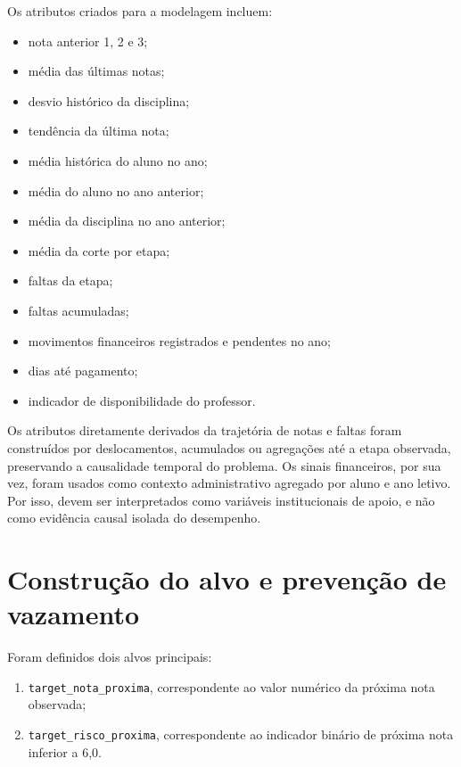 Os atributos criados para a modelagem incluem:
\begin{itemize}
    \item nota anterior 1, 2 e 3;
    \item m\'edia das \'ultimas notas;
    \item desvio hist\'orico da disciplina;
    \item tend\^encia da \'ultima nota;
    \item m\'edia hist\'orica do aluno no ano;
    \item m\'edia do aluno no ano anterior;
    \item m\'edia da disciplina no ano anterior;
    \item m\'edia da corte por etapa;
    \item faltas da etapa;
    \item faltas acumuladas;
    \item movimentos financeiros registrados e pendentes no ano;
    \item dias at\'e pagamento;
    \item indicador de disponibilidade do professor.
\end{itemize}

Os atributos diretamente derivados da trajet\'oria de notas e faltas foram constru\'idos por deslocamentos, acumulados ou agrega\c{c}\~oes at\'e a etapa observada, preservando a causalidade temporal do problema. Os sinais financeiros, por sua vez, foram usados como contexto administrativo agregado por aluno e ano letivo. Por isso, devem ser interpretados como vari\'aveis institucionais de apoio, e n\~ao como evid\^encia causal isolada do desempenho.

\section{Constru\c{c}\~ao do alvo e preven\c{c}\~ao de vazamento}
\label{sec:definicao-alvos-dataset}
\label{sec:alvo}
\label{sec:regras-evitar-vazamento}
\label{sec:prevencao-vazamento}

Foram definidos dois alvos principais:
\begin{enumerate}
    \item \texttt{target\_nota\_proxima}, correspondente ao valor num\'erico da pr\'oxima nota observada;
    \item \texttt{target\_risco\_proxima}, correspondente ao indicador bin\'ario de pr\'oxima nota inferior a 6,0.
\end{enumerate}

